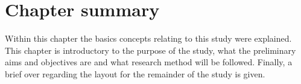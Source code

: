 \section{Chapter summary}
\label{section1.7}
Within this chapter the basics concepts relating to this study were explained. This chapter is introductory to the purpose of the study, what the preliminary aims and objectives are and what research method will be followed. Finally, a brief over regarding the layout for the remainder of the study is given.

